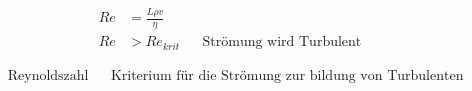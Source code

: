 \begin{boxleft}
\\
\\
\\
\\
\\
\end{boxleft}\begin{boxrightshaded}
\begin{align*}
Re&=\frac{L\rho v}{\eta}\\
Re&>Re_{krit}&&\text{Strömung wird Turbulent}
\end{align*}
\end{boxrightshaded}

\begin{boxshaded}
\begin{align*}
&\text{Reynoldszahl}&&\text{Kriterium für die Strömung zur bildung von Turbulenten}
\end{align*}
\end{boxshaded}